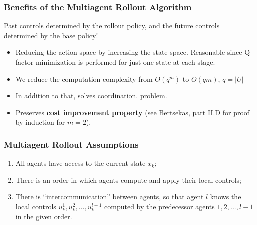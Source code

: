 \documentclass{beamer}
\begin{document}

    \begin{frame}
	\frametitle{Benefits of the Multiagent Rollout Algorithm}
	
			Past controls determined by
		the rollout policy, and the future controls determined by
		the base policy!
	
	
	
	\begin{itemize}
		\item Reducing the action space by increasing the state space. Reasonable since Q-factor minimization is performed for just
		one state at each stage. 	
		
		\item We reduce the computation complexity 
		from $O(q^m)$ to $O(qm)$, $q=|U|$
		
		\item In addition to that, solves coordination.
		problem.
		
		\item Preserves \textbf{cost improvement property} 
		(see Bertsekas, part II.D 
		for proof by induction for $m=2$).
		
	\end{itemize}
	
	
	\end{frame}



    \begin{frame}
	\frametitle{Multiagent Rollout Assumptions}
	
	\begin{enumerate}
		\item All agents have access to the current state $x_k$;
		
		\item There is an order in which agents compute and apply
		their local controls;
		
		\item There is ``intercommunication'' between agents, 
		so that agent $l$ knows the local controls 
		$u_k^1, u_k^2, ..., u_k^{l-1}$ 
		computed by the
		predecessor agents 	$1, 2, ..., l-1$ 
		in the given order.
	\end{enumerate}
	
	
\end{frame}




\end{document}
